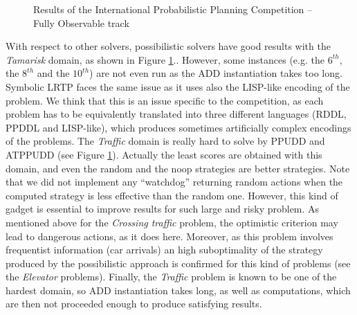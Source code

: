 \begin{figure}
\caption[Results of IPPC 2014: \textit{Tamarisk} and \textit{Traffic} problems]{
Results of the International Probabilistic Planning Competition -- Fully Observable track}
\label{figure_IPPC_TAM_TRA}
\end{figure}


With respect to other solvers, possibilistic solvers have good results 
with the \textit{Tamarisk} domain, as shown in Figure \ref{figure_IPPC_TAM_TRA}..
However, some instances (e.g. the $6^{th}$, the $8^{th}$ and the $10^{th}$) 
are not even run as the ADD instantiation takes too long. 
Symbolic LRTP faces the same issue
as it uses also the LISP-like encoding of the problem.
We think that this is an issue specific to the competition,
as each problem has to be equivalently translated into
three different languages (RDDL, PPDDL and LISP-like),
which produces sometimes artificially complex
encodings of the problems.
The \textit{Traffic} domain is really hard to solve by PPUDD and ATPPUDD (see Figure \ref{figure_IPPC_TAM_TRA}). 
Actually the least scores are obtained with this domain,
and even the random and the noop strategies are better strategies.
Note that we did not implement any ``watchdog''
returning random actions when the computed strategy is less effective than the random one.
However, this kind of gadget is essential to improve results for such large and risky problem. 
As mentioned above for the \textit{Crossing traffic} problem, 
the optimistic criterion may lead to dangerous actions, as it does here.
Moreover, as this problem involves frequentist information (car arrivals)
an high suboptimality of the strategy produced by the possibilistic approach
is confirmed for this kind of problems (see the \textit{Elevator} problems). 
Finally, the \textit{Traffic} problem is known to be one of the hardest domain,
so ADD instantiation takes long, as well as computations, 
which are then not proceeded enough to produce satisfying results. 

